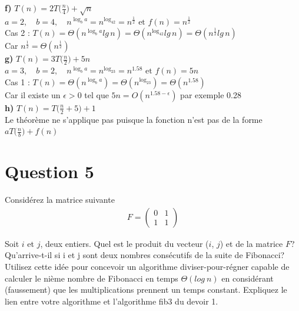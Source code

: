 \documentclass[12pt]{article}
\begin{document}
\textbf{f) } \(T(n)=2T\big(\frac{n}{4}\big)+\sqrt{n}\) \\

\(a=2, \quad b=4, \quad n^{\log_ba} = n^{\log_42}=n^{\frac{1}{2}} \text{ et } f(n) = n^{\frac{1}{2}}\) \\

Cas 2 : \(T(n) = \Theta(n^{\log_ba}lg \, n) = \Theta(n^{\log_42}lg \, n) = \Theta(n^{\frac{1}{2}}lg \, n) \) \\

Car \(n^{\frac{1}{2}} = \Theta(n^{\frac{1}{2}}) \) \\

\textbf{g) } \(T(n)=3T\big(\frac{n}{2}\big)+5n\) \\

\(a=3, \quad b=2, \quad n^{\log_ba} = n^{\log_23}=n^{1.58} \text{ et } f(n) = 5n\) \\

Cas 1 : \(T(n) = \Theta(n^{\log_ba}) = \Theta(n^{\log_23}) = \Theta(n^{1.58}) \) \\

Car il existe un \(\epsilon>0\) tel que \(5n = O(n^{1.58-\epsilon}) \) par exemple 0.28 \\

\textbf{h) } \(T(n)=T\big(\frac{n}{2}+5\big)+1\) \\

Le théorème ne s'applique pas puisque la fonction n'est pas de la forme \(aT \big(\frac{n}{b} \big) +f(n)\)

\newpage

\section*{Question 5}
Considérez la matrice suivante
\begin{align*}
	F =
	\begin{pmatrix}
		0 & 1 \\
		1 & 1
	\end{pmatrix}
\end{align*}

Soit \(i\) et \(j\), deux entiers. Quel est le produit du vecteur (\(i\), \(j\)) et de la matrice \(F\)? Qu’arrive-t-il si i et j sont deux nombres consécutifs de la suite de Fibonacci? Utilisez cette idée pour concevoir un algorithme diviser-pour-régner capable de calculer le nième nombre de Fibonacci en temps \(\Theta (log \: n)\) en considérant (faussement) que les multiplications prennent un temps constant. Expliquez le lien entre votre algorithme et l’algorithme fib3 du devoir 1. \newline
\end{document}
